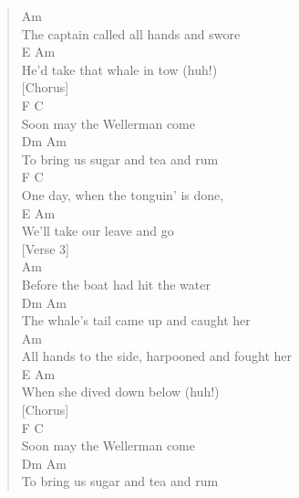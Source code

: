 \documentclass[11pt]{article}
\begin{document}
\begin{verse}
\hspace*{5em}Am\\
The captain called all hands and swore\\
\hspace*{6em}E                 Am\\
He'd take that whale in tow (huh!)\\
\vspace*{1em}
[Chorus]\\
\vspace*{1em}
\hspace*{1em}F            C\\
Soon may the Wellerman come\\
\hspace*{4em}Dm                Am\\
To bring us sugar and tea and rum\\
F                  C\\
One day, when the tonguin’ is done,\\
\hspace*{7em}E                 Am\\
We’ll take our leave and go\\
\vspace*{1em}
[Verse 3]\\
\vspace*{1em}
\hspace*{3em}Am\\
Before the boat had hit the water\\
\hspace*{6em}Dm              Am\\
The whale's tail came up and caught her\\
\hspace*{5em}Am\\
All hands to the side, harpooned and fought her\\
\hspace*{6em}E                Am\\
When she dived down below (huh!)\\
\vspace*{1em}
[Chorus]\\
\vspace*{1em}
\hspace*{1em}F            C\\
Soon may the Wellerman come\\
\hspace*{4em}Dm                 Am\\
To bring us sugar and tea and rum\\

\end{verse}
\end{document}
